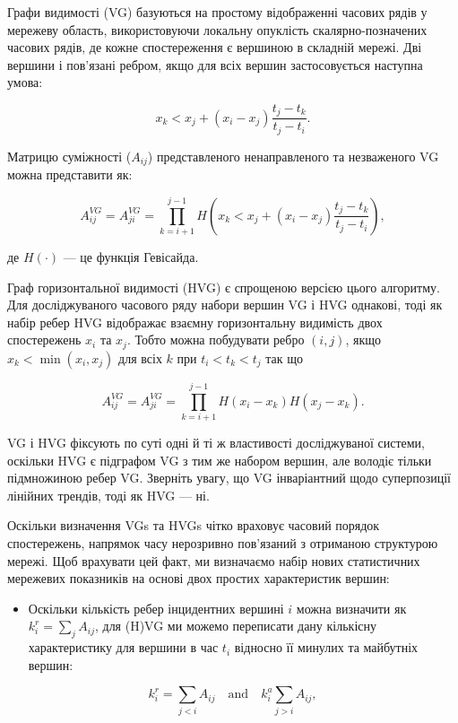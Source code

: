 \documentclass[
  letterpaper,
]{report}
\providecommand{\tightlist}{%
  \setlength{\itemsep}{0pt}\setlength{\parskip}{0pt}}\usepackage{longtable,booktabs,array}
\begin{document}
Графи видимості (VG) базуються на простому відображенні часових рядів у
мережеву область, використовуючи локальну опуклість скалярно-позначених
часових рядів, де кожне спостереження є вершиною в складній мережі. Дві
вершини і пов'язані ребром, якщо для всіх вершин застосовується наступна
умова:

\[ 
x_{k} < x_{j} + \left( x_{i} - x_{j} \right) \frac{t_{j}-t_{k}}{t_{j}-t_{i}}. 
\]

Матрицю суміжності (\(A_{ij}\)) представленого ненаправленого та
незваженого VG можна представити як:

\[ 
A_{ij}^{VG} = A_{ji}^{VG} = \prod_{k=i+1}^{j-1} H \left( x_{k} < x_{j} + \left( x_{i} - x_{j} \right) \frac{t_{j}-t_{k}}{t_{j}-t_{i}} \right), 
\]

де \(H( \cdot )\) --- це функція Гевісайда.

Граф горизонтальної видимості (HVG) є спрощеною версією цього алгоритму.
Для досліджуваного часового ряду набори вершин VG і HVG однакові, тоді
як набір ребер HVG відображає взаємну горизонтальну видимість двох
спостережень \(x_{i}\) та \(x_{j}\). Тобто можна побудувати ребро
\((i,j)\), якщо \(x_{k} < \min(x_{i}, x_{j})\) для всіх \(k\) при
\(t_{i} < t_{k} < t_{j}\) так що

\[ 
A_{ij}^{VG} = A_{ji}^{VG} = \prod_{k=i+1}^{j-1} H \left( x_{i} - x_{k} \right) H \left( x_{j} - x_{k} \right). 
\]

VG і HVG фіксують по суті одні й ті ж властивості досліджуваної системи,
оскільки HVG є підграфом VG з тим же набором вершин, але володіє тільки
підмножиною ребер VG. Зверніть увагу, що VG інваріантний щодо
суперпозиції лінійних трендів, тоді як HVG --- ні.

Оскільки визначення VGs та HVGs чітко враховує часовий порядок
спостережень, напрямок часу нерозривно пов'язаний з отриманою структурою
мережі. Щоб врахувати цей факт, ми визначаємо набір нових статистичних
мережевих показників на основі двох простих характеристик вершин:

\begin{itemize}
\tightlist
\item
  Оскільки кількість ребер інцидентних вершині \(i\) можна визначити як
  \(k_{i}^{r} = \sum_{j} A_{ij}\), для (H)VG ми можемо переписати дану
  кількісну характеристику для вершини в час \(t_{i}\) відносно її
  минулих та майбутніх вершин:
\end{itemize}

\[ 
k_{i}^{r} = \sum_{j<i} A_{ij} \quad \mathrm{and} \quad k_{i}^{a} \sum_{j>i} A_{ij}, 
\]
\end{document}
